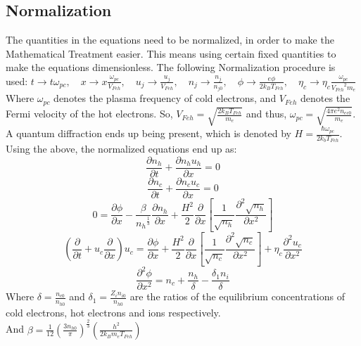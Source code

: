 \documentclass[a4paper, 12pt]{article}
\begin{document}
\subsection{Normalization}
\label{normalize}
The quantities in the equations need to be normalized, in order to make the Mathematical Treatment easier. This means using certain fixed quantities to make the equations dimensionless.
The following Normalization procedure is used:\newline
\newline
\begin{math}
    t \rightarrow t\omega_{pc},\quad
    x \rightarrow x\frac{\omega_{pc}}{V_{Feh}},\quad
    u_j \rightarrow \frac{u_j}{V_{Feh}},\quad
    n_j \rightarrow \frac{n_j}{n_{j0}},\quad
    \phi \rightarrow \frac{e\phi}{2k_B T_{Feh}},\quad
    \eta_c \rightarrow \eta_c \frac{\omega_{pc}}{{V_{Feh}}^2 m_e}
\end{math}
\newline
\newline
Where $\omega_{pc}$ denotes the plasma frequency of cold electrons, and $V_{Feh}$ denotes the Fermi velocity of the hot electrons. So, $V_{Feh} = \sqrt{\frac{2k_B T_{Feh}}{m_e}}$ and thus,
$\omega_{pc} = \sqrt{\frac{4\pi e^2 n_{ec0}}{m_e}}$. A quantum diffraction ends up being present, which is denoted by $H = \frac{\hbar \omega_{pc}}{2k_b T_{Feh}}$. Using the above, the normalized equations end up as:
\begin{equation}
    \frac{\partial n_h}{\partial t} + \frac{\partial n_h u_h}{\partial x} = 0 \label{cont-h}
\end{equation}
\begin{equation}
    \frac{\partial n_c}{\partial t} + \frac{\partial n_c u_c}{\partial x} = 0 \label{cont-c}
\end{equation}
\begin{equation}
    0 = \frac{\partial \phi}{\partial x} - \frac{\beta}{{n_h}^\frac{1}{3}}\frac{\partial n_h}{\partial x} + \frac{H^2}{2}\frac{\partial}{\partial x}
    [\frac{1}{\sqrt{n_h}}\frac{\partial^2 \sqrt{n_h}}{\partial x^2}] \label{mom-h}
\end{equation}
\begin{equation}
    (\frac{\partial}{\partial t} + u_c \frac{\partial}{\partial x})u_c = \frac{\partial \phi}{\partial x} + \frac{H^2}{2}\frac{\partial}{\partial x}
    [\frac{1}{\sqrt{n_c}}\frac{\partial^2 \sqrt{n_c}}{\partial x^2}] + \eta_c \frac{\partial^2 u_c}{\partial x^2} \label{mom-c}
\end{equation}
\begin{equation}
    \frac{\partial^2 \phi}{\partial x^2} = n_c + \frac{n_h}{\delta} - \frac{\delta_1 n_i}{\delta} \label{poisson}
\end{equation} 
\newline
Where $\delta = \frac{n_{c0}}{n_{h0}}$ and $\delta_1 = \frac{Z_i n_{i0}}{n_{h0}}$ are the ratios of the equilibrium concentrations of cold electrons, hot electrons and ions respectively.\\
And $\beta = \frac{1}{12}({\frac{3n_{h0}}{\pi}})^\frac{2}{3}(\frac{h^2}{2k_B m_e T_{Feh}})$
\end{document}
